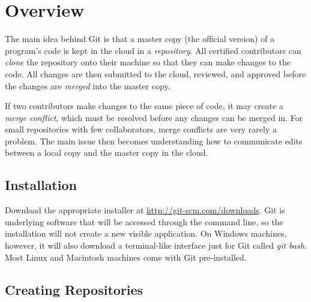 \label{appendix:git}

\section*{Overview} %

The main idea behind Git is that a master copy (the official version) of a program's code is kept in the cloud in a \emph{repository}.
All certified contributors can \emph{clone} the repository onto their machine so that they can make changes to the code.
All changes are then submitted to the cloud, reviewed, and approved before the changes are \emph{merged} into the master copy.

If two contributors make changes to the same piece of code, it may create a \emph{merge conflict}, which must be resolved before any changes can be merged in.
For small repositories with few collaborators, merge conflicts are very rarely a problem.
The main issue then becomes understanding how to communicate edits between a local copy and the master copy in the cloud.

\subsection*{Installation} %

Download the appropriate installer at \url{http://git-scm.com/downloads}.
Git is underlying software that will be accessed through the command line, so the installation will not create a new visible application.
On Windows machines, however, it will also download a terminal-like interface just for Git called \emph{git bash}.
Most Linux and Macintosh machines come with Git pre-installed.

\subsection*{Creating Repositories} %

